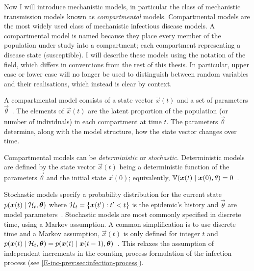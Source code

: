 \documentclass[thesis.tex]{subfiles}
\begin{document}
Now I will introduce mechanistic models, in particular the class of mechanistic transmission models known as \emph{compartmental} models.
Compartmental models are the most widely used class of mechanistic infectious disease models.
A compartmental model is named because they place every member of the population under study into a compartment; each compartment representing a disease state (\eg susceptible).
I will describe these models using the notation of the field, which differs in conventions from the rest of this thesis.
In particular, upper case or lower case will no longer be used to distinguish between random variables and their realisations, which instead is clear by context.

A compartmental model consists of a state vector $\vec{x}(t)$ and a set of parameters $\vec{\theta}$~\autocite{birrellEvidence,dukicTracking,corbellaThesis}.
The elements of $\vec{x}(t)$ are the latent proportion of the population (or number of individuals) in each compartment at time $t$.
The parameters $\vec{\theta}$ determine, along with the model structure, how the state vector changes over time.

Compartmental models can be \emph{deterministic} or \emph{stochastic}.
Deterministic models are defined by the state vector $\vec{x}(t)$ being a deterministic function of the parameters $\vec{\theta}$ and the initial state $\vec{x}(0)$; equivalently, $\operatorname{\mathbb{V}}(\bm{x}(t) \mid \bm{x}(0), \theta) = 0$~\autocite{birrellEvidence}.

Stochastic models specify a probability distribution for the current state $p(\bm{x}(t) \mid \mathcal{H}_t, \bm{\theta})$ where $\mathcal{H}_t = \{ \bm{x}(t') : t' < t \}$ is the epidemic's history and $\vec{\theta}$ are model parameters~\autocite{birrellEvidence,dukicTracking,corbellaThesis,keelingModeling}.
Stochastic models are most commonly specified in discrete time, using a Markov assumption.
A common simplification is to use discrete time and a Markov assumption, \ie $\vec{x}(t)$ is only defined for integer $t$ and $p(\bm{x}(t) \mid \mathcal{H}_t, \bm{\theta}) = p(\bm{x}(t) \mid \bm{x}(t-1), \bm{\theta})$~\autocite{birrellEvidence}.
This relaxes the assumption of independent increments in the counting process formulation of the infection process (see \cref{E-inc-prev:sec:infection-process}).
\end{document}
